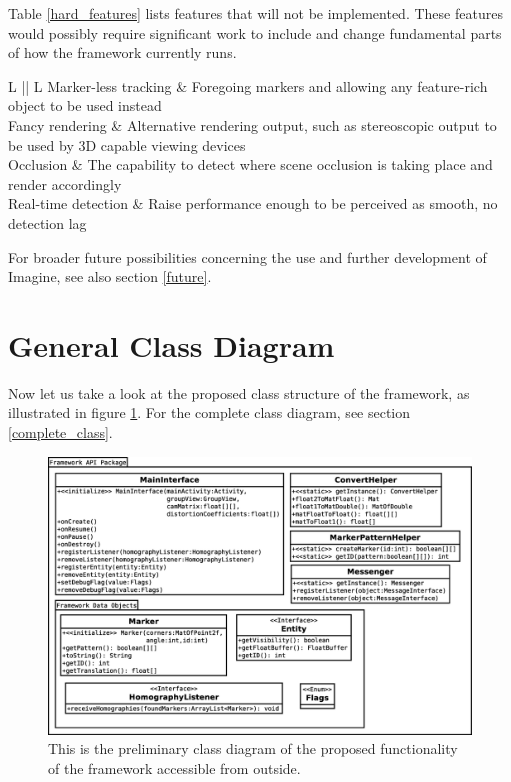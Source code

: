 Table \ref{hard_features} lists features that will not be implemented.
These features would possibly require significant work to include and change fundamental parts of how the framework currently runs.

\begin{table}[H]
	\centering
	\begin{tabulary}{\textwidth}{L || L}
	Marker-less tracking & Foregoing markers and allowing any feature-rich object to be used instead\\
	\hline
	Fancy rendering & Alternative rendering output, such as stereoscopic output to be used by 3D capable viewing devices\\
	\hline
	Occlusion & The capability to detect where scene occlusion is taking place and render accordingly\\
	\hline
	Real-time detection & Raise performance enough to be perceived as smooth, no detection lag\\
	\end{tabulary}
	\caption[Difficult Features]{Features that are not implementable without comprehensive work.}
	\label{hard_features}
\end{table}

For broader future possibilities concerning the use and further development of Imagine, see also section \ref{future}.

\newpage
\section{General Class Diagram}

Now let us take a look at the proposed class structure of the framework, as illustrated in figure \ref{fig:class_diagram}.
For the complete class diagram, see section \ref{complete_class}.

\begin{figure}[H]
	\centering
	\includegraphics[width=13cm]{img/class_diagram.eps}
	\caption[Public Class Diagram]{This is the preliminary class diagram of the proposed functionality of the framework accessible from outside.}
	\label{fig:class_diagram}
\end{figure}

